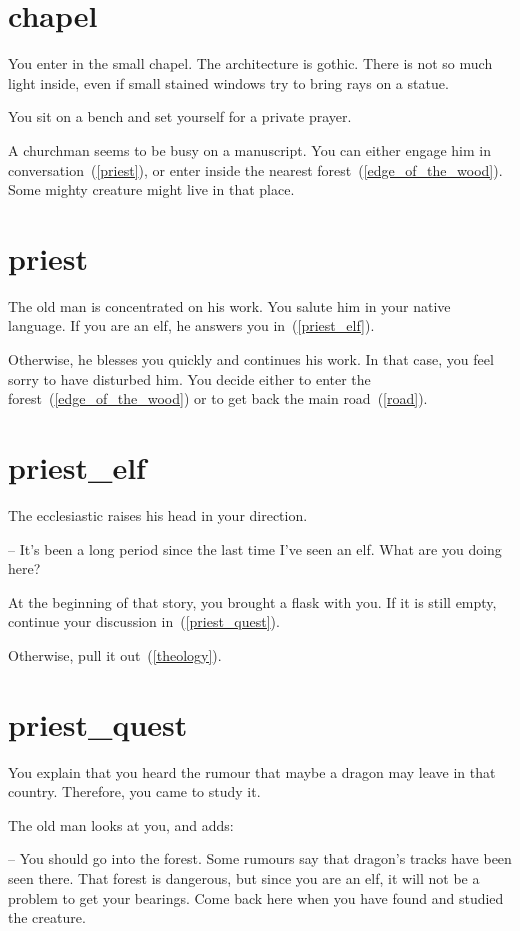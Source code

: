 \section{chapel}

You enter in the small chapel. The architecture is gothic. There is not so much
light inside, even if small stained windows try to bring rays on a statue.

You sit on a bench and set yourself for a private prayer.

A churchman seems to be busy on a manuscript. You can either engage him in
conversation~(\ref{priest}), or enter inside the nearest
forest~(\ref{edge_of_the_wood}). Some mighty creature might live in that place.

\section{priest}

The old man is concentrated on his work. You salute him in your native language.
If you are an elf, he answers you in~(\ref{priest_elf}).

Otherwise, he blesses you quickly and continues his work. In that case, you feel
sorry to have disturbed him. You decide either to enter the
forest~(\ref{edge_of_the_wood}) or to get back the main road~(\ref{road}).

\section{priest_elf}

The ecclesiastic raises his head in your direction.

-- It's been a long period since the last time I've seen an elf. What are you
doing here?

At the beginning of that story, you brought a flask with you. If it is still
empty, continue your discussion in~(\ref{priest_quest}).

Otherwise, pull it
out~(\ref{theology}).

\section{priest_quest}

You explain that you heard the rumour that maybe a dragon may leave in that
country. Therefore, you came to study it.

The old man looks at you, and adds:

-- You should go into the forest. Some rumours say that dragon's tracks have
been seen there. That forest is dangerous, but since you are an elf, it will not
be a problem to get your bearings. Come back here when you have found and
studied the creature.

